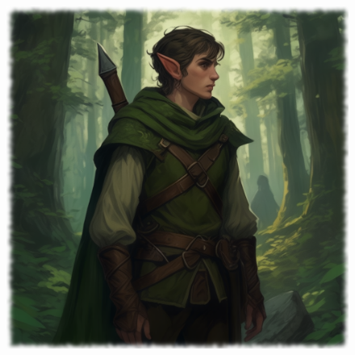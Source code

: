 \begin{figure}[h]
\begin{center}
\includegraphics[scale=0.24]{img/ai-images/elf.png}
\end{center}
\end{figure}
\label{creature:elf}
